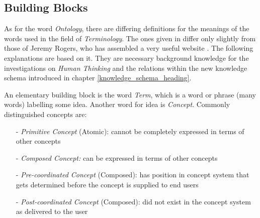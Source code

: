 %
%
%
%
%
%
%

\subsection{Building Blocks}
\label{building_blocks_heading}

As for the word \emph{Ontology}, there are differing definitions for the
meanings of the words used in the field of \emph{Terminology}. The ones given
in \cite{metaterminology} differ only slightly from those of Jeremy Rogers, who
has assembled a very useful website \cite{rogers}. The following explanations
are based on it. They are necessary background knowledge for the investigations
on \emph{Human Thinking} and the relations within the new knowledge schema
introduced in chapter \ref{knowledge_schema_heading}.

An elementary building block is the word \emph{Term}, which is a word or phrase
(many words) labelling some idea. Another word for idea is \emph{Concept}.
Commonly distinguished concepts are:

\begin{itemize}
    \item[-] \emph{Primitive Concept} (Atomic): cannot be
        completely expressed in terms of other concepts
    \item[-] \emph{Composed Concept:} can be expressed in terms of other concepts
    \item[-] \emph{Pre-coordinated Concept} (Composed): has position in concept
        system that gets determined before the concept is supplied to end users
    \item[-] \emph{Post-coordinated Concept} (Composed): did not exist in the
        concept system as delivered to the user
\end{itemize}

